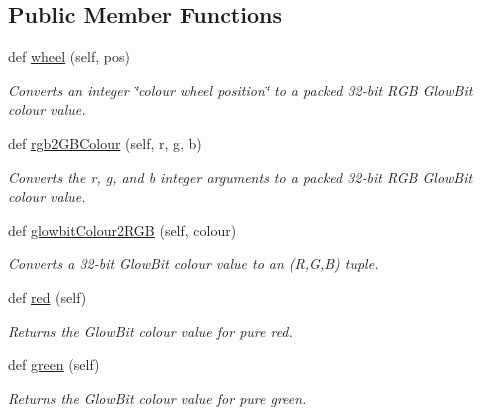 \subsection*{Public Member Functions}
\begin{DoxyCompactItemize}
\item 
def \hyperlink{classglowbit_1_1colourFunctions_afb989958ec7aa4dfb7a04f359da5969a}{wheel} (self, pos)
\begin{DoxyCompactList}\small\item\em Converts an integer \char`\"{}colour wheel position\char`\"{} to a packed 32-\/bit R\+GB Glow\+Bit colour value. \end{DoxyCompactList}\item 
def \hyperlink{classglowbit_1_1colourFunctions_a1c24f694a16f3c721a0e7771740ebc56}{rgb2\+G\+B\+Colour} (self, r, g, b)
\begin{DoxyCompactList}\small\item\em Converts the r, g, and b integer arguments to a packed 32-\/bit R\+GB Glow\+Bit colour value. \end{DoxyCompactList}\item 
def \hyperlink{classglowbit_1_1colourFunctions_a6f887561ea3261440350ac3b1df4a259}{glowbit\+Colour2\+R\+GB} (self, colour)
\begin{DoxyCompactList}\small\item\em Converts a 32-\/bit Glow\+Bit colour value to an (R,G,B) tuple. \end{DoxyCompactList}\item 
\mbox{\label{classglowbit_1_1colourFunctions_a409c07eda953f09150f4ba67111f14e4}} 
def \hyperlink{classglowbit_1_1colourFunctions_a409c07eda953f09150f4ba67111f14e4}{red} (self)
\begin{DoxyCompactList}\small\item\em Returns the Glow\+Bit colour value for pure red. \end{DoxyCompactList}\item 
\mbox{\label{classglowbit_1_1colourFunctions_a822b37d8fa35cccd5ea9f2e0aa012435}} 
def \hyperlink{classglowbit_1_1colourFunctions_a822b37d8fa35cccd5ea9f2e0aa012435}{green} (self)
\begin{DoxyCompactList}\small\item\em Returns the Glow\+Bit colour value for pure green. \end{DoxyCompactList}\item 

\end{DoxyCompactItemize}
